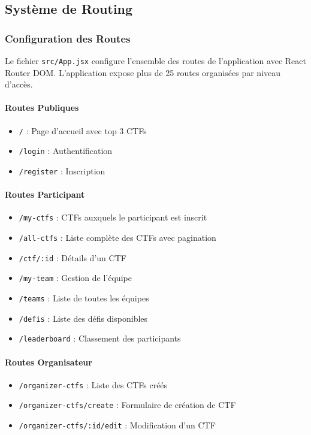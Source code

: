 \subsection{Système de Routing}

\subsubsection{Configuration des Routes}

Le fichier \texttt{src/App.jsx} configure l'ensemble des routes de l'application avec React Router DOM. L'application expose plus de 25 routes organisées par niveau d'accès.

\paragraph{Routes Publiques}
\begin{itemize}
    \item \texttt{/} : Page d'accueil avec top 3 CTFs
    \item \texttt{/login} : Authentification
    \item \texttt{/register} : Inscription
\end{itemize}

\paragraph{Routes Participant}
\begin{itemize}
    \item \texttt{/my-ctfs} : CTFs auxquels le participant est inscrit
    \item \texttt{/all-ctfs} : Liste complète des CTFs avec pagination
    \item \texttt{/ctf/:id} : Détails d'un CTF
    \item \texttt{/my-team} : Gestion de l'équipe
    \item \texttt{/teams} : Liste de toutes les équipes
    \item \texttt{/defis} : Liste des défis disponibles
    \item \texttt{/leaderboard} : Classement des participants
\end{itemize}

\paragraph{Routes Organisateur}
\begin{itemize}
    \item \texttt{/organizer-ctfs} : Liste des CTFs créés
    \item \texttt{/organizer-ctfs/create} : Formulaire de création de CTF
    \item \texttt{/organizer-ctfs/:id/edit} : Modification d'un CTF
\end{itemize}

